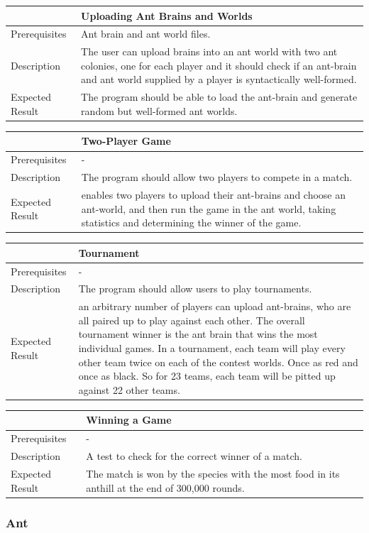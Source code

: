 \documentclass[11pt]{article}
\begin{document}
\begin{longtable}[c]{@{}p{}p{}@{}}
\toprule
& Uploading Ant Brains and Worlds \tabularnewline
\midrule
Prerequisites & Ant brain and ant world files. \tabularnewline
Description & The user can upload brains into an ant world with two
ant colonies, one for each player and it should check if an ant-brain
and ant world supplied by a player is syntactically well-formed. \tabularnewline
Expected Result & The program should be able to load the ant-brain and
generate random but well-formed ant worlds.\tabularnewline
\bottomrule
\end{longtable}

\begin{longtable}[c]{@{}p{}p{}@{}}
\toprule
& Two-Player Game \tabularnewline
\midrule
Prerequisites & - \tabularnewline
Description & The program should allow two players to compete in a match. \tabularnewline
Expected Result & enables two players to upload their ant-brains and
choose an ant-world, and then run the game in the ant world, taking
statistics and determining the winner of the game. \tabularnewline
\bottomrule
\end{longtable}

\begin{longtable}[c]{@{}p{}p{}@{}}
\toprule
& Tournament \tabularnewline
\midrule
Prerequisites & - \tabularnewline
Description & The program should allow users to play tournaments. \tabularnewline
Expected Result & an arbitrary number of players can upload ant-brains,
who are all paired up to play against each other. The overall tournament
winner is the ant brain that wins the most individual games. In a
tournament, each team will play every other team twice on each of the
contest worlds. Once as red and once as black. So for 23 teams, each
team will be pitted up against 22 other teams. \tabularnewline
\bottomrule
\end{longtable}

\begin{longtable}[c]{@{}p{}p{}@{}}
\toprule
& Winning a Game \tabularnewline
\midrule
Prerequisites & - \tabularnewline
Description & A test to check for the correct winner of a match. \tabularnewline
Expected Result & The match is won by the species with the most food in
its anthill at the end of 300,000 rounds.\tabularnewline
\bottomrule
\end{longtable}

\subsubsection{Ant}\label{ant}
\end{document}
